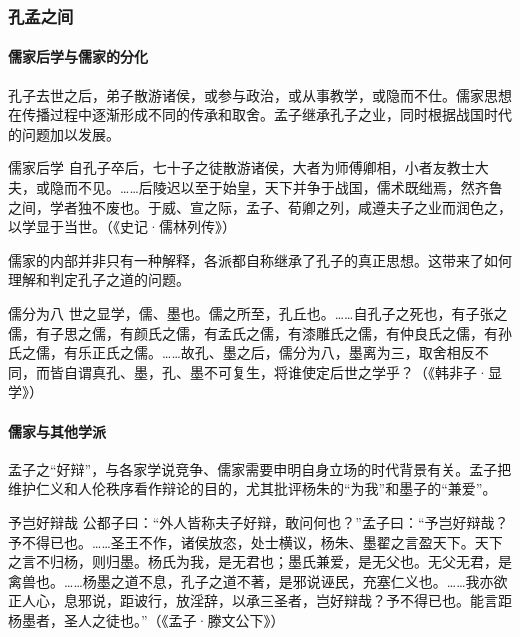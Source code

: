 \subsubsection{孔孟之间}

\paragraph{儒家后学与儒家的分化}

孔子去世之后，弟子散游诸侯，或参与政治，或从事教学，或隐而不仕。儒家思想在传播过程中逐渐形成不同的传承和取舍。孟子继承孔子之业，同时根据战国时代的问题加以发展。

\begin{fancybox}{儒家后学}
    自孔子卒后，七十子之徒散游诸侯，大者为师傅卿相，小者友教士大夫，或隐而不见。……后陵迟以至于始皇，天下并争于战国，儒术既绌焉，然齐鲁之间，学者独不废也。于威、宣之际，孟子、荀卿之列，咸遵夫子之业而润色之，以学显于当世。（《史记·儒林列传》）
\end{fancybox}

儒家的内部并非只有一种解释，各派都自称继承了孔子的真正思想。这带来了如何理解和判定孔子之道的问题。

\begin{fancybox}{儒分为八}
    世之显学，儒、墨也。儒之所至，孔丘也。……自孔子之死也，有子张之儒，有子思之儒，有颜氏之儒，有孟氏之儒，有漆雕氏之儒，有仲良氏之儒，有孙氏之儒，有乐正氏之儒。……故孔、墨之后，儒分为八，墨离为三，取舍相反不同，而皆自谓真孔、墨，孔、墨不可复生，将谁使定后世之学乎？（《韩非子·显学》）
\end{fancybox}

\paragraph{儒家与其他学派}

孟子之“好辩”，与各家学说竞争、儒家需要申明自身立场的时代背景有关。孟子把维护仁义和人伦秩序看作辩论的目的，尤其批评杨朱的“为我”和墨子的“兼爱”。

\begin{fancybox}{予岂好辩哉}
    公都子曰：“外人皆称夫子好辩，敢问何也？”孟子曰：“予岂好辩哉？予不得已也。……圣王不作，诸侯放恣，处士横议，杨朱、墨翟之言盈天下。天下之言不归杨，则归墨。杨氏为我，是无君也；墨氏兼爱，是无父也。无父无君，是禽兽也。……杨墨之道不息，孔子之道不著，是邪说诬民，充塞仁义也。……我亦欲正人心，息邪说，距诐行，放淫辞，以承三圣者，岂好辩哉？予不得已也。能言距杨墨者，圣人之徒也。”（《孟子·滕文公下》）
\end{fancybox}

